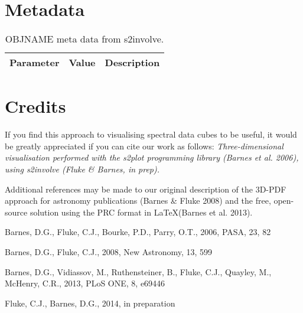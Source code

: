 \documentclass{article}
\begin{document}
\section{Metadata}

\begin{table}[h]
\caption{{OBJNAME} meta data from {\sc s2involve}.}
\label{tbl:meta}
\begin{center}
\begin{tabular}{lrl}
{\bf Parameter} & {\bf Value} & {\bf Description}\\
\hline 

\hline
\end{tabular}
\end{center}
\end{table}

\section*{Credits}
If you find this approach to visualising spectral data cubes to be useful, 
it would be greatly appreciated if you can cite our work as follows:
{\em Three-dimensional visualisation performed with the {\sc s2plot} programming 
library (Barnes et al. 2006), using {\sc s2involve} (Fluke \& Barnes, {\em in prep}).}

Additional references may be made to our original description of the 3D-PDF approach
for astronomy publications (Barnes \& Fluke 2008) and the free, open-source solution 
using the PRC format in \LaTeX (Barnes et al. 2013). 


\begin{thebibliography}{99}
Barnes, D.G., Fluke, C.J., Bourke, P.D., Parry, O.T., 2006, PASA, 23, 82

Barnes, D.G., Fluke, C.J., 2008, New Astronomy, 13, 599 

Barnes, D.G., Vidiassov, M., Ruthensteiner, B., Fluke, C.J., Quayley, M., McHenry, C.R., 2013, PLoS ONE, 8, e69446

Fluke, C.J., Barnes, D.G., 2014, in preparation

\end{thebibliography}
\end{document}
